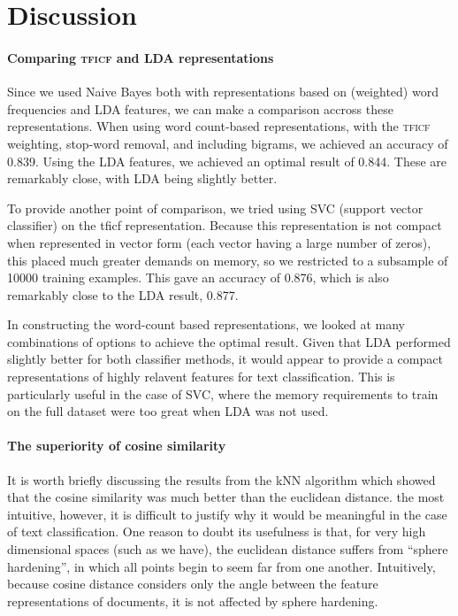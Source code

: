 \documentclass[conference,letterpaper]{IEEEtran}
\begin{document}
\section{Discussion}
\paragraph*{Comparing \textsc{tficf} and LDA representations}
Since we used Naive Bayes both with representations based on (weighted)
word frequencies and LDA features, we can make a comparison accross these 
representations.  When using word count-based representations, with the \textsc{tficf} weighting, stop-word removal, and including bigrams, we achieved an
accuracy of 0.839.  Using the LDA features, we achieved an optimal result
of 0.844.  These are remarkably close, with LDA being slightly better.

To provide another point of comparison, we tried using SVC (support vector
classifier) on the tficf representation.  Because this representation is 
not compact when represented in vector form (each vector having a large
number of zeros), this placed much greater demands on memory, so we restricted
to a subsample of 10000 training examples.  This gave an accuracy of 0.876,
which is also remarkably close to the LDA result, 0.877.

In constructing the word-count based representations, we looked at many 
combinations of options to achieve the optimal result.  Given that LDA 
performed slightly better for both classifier methods, it would appear to
provide a compact representations of highly relavent features for text 
classification.  This is particularly useful in the case of SVC, where the
memory requirements to train on the full dataset were too great when LDA was 
not used.  

\paragraph*{The superiority of cosine similarity}
It is worth briefly discussing the results from the kNN algorithm which 
showed that the cosine similarity was much better than the euclidean distance.
the most intuitive, however, it is difficult to justify why it would be
meaningful in the case of text classification.  One reason to doubt its 
usefulness is that, for very high dimensional spaces (such as we have), 
the euclidean distance suffers from ``sphere hardening'', in which all points
begin to seem far from one another.
Intuitively, because cosine distance considers only the angle between 
the feature representations of documents, it is not affected by sphere 
hardening.  
\end{document}
